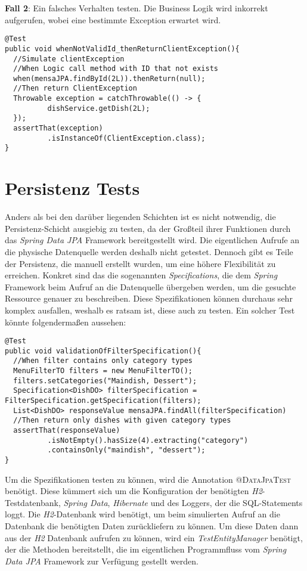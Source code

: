 \textbf{Fall 2}: Ein falsches Verhalten testen. Die Business Logik wird inkorrekt aufgerufen, wobei eine bestimmte Exception erwartet wird. 

\newpage
\begin{lstlisting}[caption={Testen von Fehlverhalten}, commentstyle=\color{green},]
@Test
public void whenNotValidId_thenReturnClientException(){
  //Simulate clientException
  //When Logic call method with ID that not exists
  when(mensaJPA.findById(2L)).thenReturn(null);
  //Then return ClientException
  Throwable exception = catchThrowable(() -> {
          dishService.getDish(2L);
  });
  assertThat(exception)
          .isInstanceOf(ClientException.class);
}
\end{lstlisting}

\section{Persistenz Tests}

Anders als bei den darüber liegenden Schichten ist es nicht notwendig, die Persistenz-Schicht ausgiebig zu testen, da der Großteil ihrer Funktionen durch das \textit{Spring Data \ac{JPA}} Framework bereitgestellt wird. Die eigentlichen Aufrufe an die physische Datenquelle werden deshalb nicht getestet. Dennoch gibt es Teile der Persistenz, die manuell erstellt wurden, um eine höhere Flexibilität zu erreichen. Konkret sind das die sogenannten \textit{Specifications}, die dem \textit{Spring} Framework beim Aufruf an die Datenquelle übergeben werden, um die gesuchte Ressource genauer zu beschreiben. Diese Spezifikationen können durchaus sehr komplex ausfallen, weshalb es ratsam ist, diese auch zu testen. Ein solcher Test könnte folgendermaßen aussehen:

\begin{lstlisting}[caption={Testen von Fehlverhalten}, commentstyle=\color{green},]
@Test
public void validationOfFilterSpecification(){
  //When filter contains only category types
  MenuFilterTO filters = new MenuFilterTO();
  filters.setCategories("Maindish, Dessert");
  Specification<DishDO> filterSpecification = FilterSpecification.getSpecification(filters);
  List<DishDO> responseValue mensaJPA.findAll(filterSpecification)
  //Then return only dishes with given category types
  assertThat(responseValue)
          .isNotEmpty().hasSize(4).extracting("category")
          .containsOnly("maindish", "dessert");
}
\end{lstlisting}

Um die Spezifikationen testen zu können, wird die Annotation \textsc{@DataJpaTest} benötigt. Diese kümmert sich um die Konfiguration der benötigten \textit{H2}-Testdatenbank, \textit{Spring Data}, \textit{Hibernate} und des Loggers, der die \ac{SQL}-Statements loggt. Die \textit{H2}-Datenbank wird benötigt, um beim simulierten Aufruf an die Datenbank die benötigten Daten zurückliefern zu können. Um diese Daten dann aus der \textit{H2} Datenbank aufrufen zu können, wird ein \textit{TestEntityManager} benötigt, der die Methoden bereitstellt, die im eigentlichen Programmfluss vom \textit{Spring Data \ac{JPA}} Framework zur Verfügung gestellt werden\autocite[][]{spring-boot-testing}.

